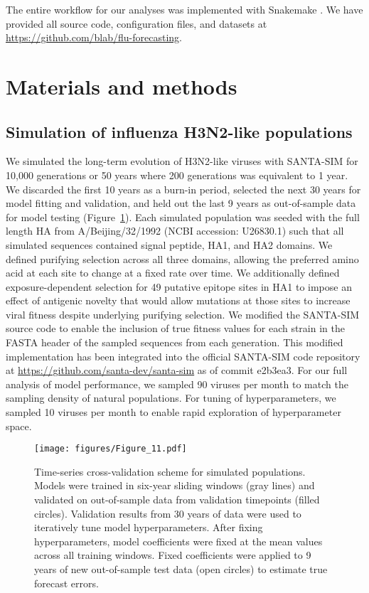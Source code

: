 The entire workflow for our analyses was implemented with Snakemake \citep{Snakemake}.
We have provided all source code, configuration files, and datasets at \href{https://github.com/blab/flu-forecasting}{https://github.com/blab/flu-forecasting}.

\section*{Materials and methods}

\subsection*{Simulation of influenza H3N2-like populations}

We simulated the long-term evolution of H3N2-like viruses with SANTA-SIM \citep{Jariani2019} for 10,000 generations or 50 years where 200 generations was equivalent to 1 year.
We discarded the first 10 years as a burn-in period, selected the next 30 years for model fitting and validation, and held out the last 9 years as out-of-sample data for model testing (Figure~\ref{fig:cross_validation_for_simulated_populations}).
Each simulated population was seeded with the full length HA from A/Beijing/32/1992 (NCBI accession: U26830.1) such that all simulated sequences contained signal peptide, HA1, and HA2 domains.
We defined purifying selection across all three domains, allowing the preferred amino acid at each site to change at a fixed rate over time.
We additionally defined exposure-dependent selection for 49 putative epitope sites in HA1 \citep{Luksza:2014hj} to impose an effect of antigenic novelty that would allow mutations at those sites to increase viral fitness despite underlying purifying selection.
We modified the SANTA-SIM source code to enable the inclusion of true fitness values for each strain in the FASTA header of the sampled sequences from each generation.
This modified implementation has been integrated into the official SANTA-SIM code repository at \url{https://github.com/santa-dev/santa-sim} as of commit e2b3ea3.
For our full analysis of model performance, we sampled 90 viruses per month to match the sampling density of natural populations.
For tuning of hyperparameters, we sampled 10 viruses per month to enable rapid exploration of hyperparameter space.

\begin{figure}
  \begin{center}
  \texttt{[image: figures/Figure\_11.pdf]}
  \caption{
  Time-series cross-validation scheme for simulated populations.
  Models were trained in six-year sliding windows (gray lines) and validated on out-of-sample data from validation timepoints (filled circles).
  Validation results from 30 years of data were used to iteratively tune model hyperparameters.
  After fixing hyperparameters, model coefficients were fixed at the mean values across all training windows.
  Fixed coefficients were applied to 9 years of new out-of-sample test data (open circles) to estimate true forecast errors.
  }
  \label{fig:cross_validation_for_simulated_populations}
  \end{center}
\end{figure}

